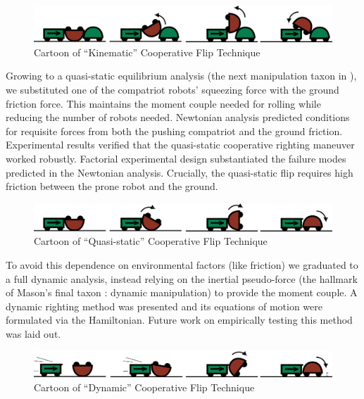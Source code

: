 \documentclass[letterpaper, 10 pt, conference]{ieeeconf}
\begin{document}
\begin{figure}[ht]
\centering
\includegraphics[width=1.0\columnwidth]{Kinematic_CoopCartoon.png}
\caption{Cartoon of ``Kinematic'' Cooperative Flip Technique}
\end{figure}

Growing to a quasi-static equilibrium analysis (the next manipulation taxon in \cite{MasonMORMBook}), we substituted one of the compatriot robots' squeezing force with the ground friction force.
This maintains the moment couple needed for rolling while reducing the number of robots needed.
Newtonian analysis predicted conditions for requisite forces from both the pushing compatriot and the ground friction.
Experimental results verified that the quasi-static cooperative righting maneuver worked robustly.
Factorial experimental design substantiated the failure modes predicted in the Newtonian analysis.
Crucially, the quasi-static flip requires high friction between the prone robot and the ground.

\begin{figure}[ht]
\centering
\includegraphics[width=1.0\columnwidth]{QuasiStatic_CoopCartoon.png}
\caption{Cartoon of ``Quasi-static'' Cooperative Flip Technique}
\end{figure}

To avoid this dependence on environmental factors (like friction) we graduated to a full dynamic analysis, instead relying on the inertial pseudo-force (the hallmark of Mason's final taxon \cite{MasonMORMBook}: dynamic manipulation) to provide the moment couple.
A dynamic righting method was presented and its equations of motion were formulated via the Hamiltonian.
Future work on empirically testing this method was laid out.

\begin{figure}[ht]
\centering
\includegraphics[width=1.0\columnwidth]{Dynamic_CoopCartoon.png}
\caption{Cartoon of ``Dynamic'' Cooperative Flip Technique}
\end{figure}
\end{document}
